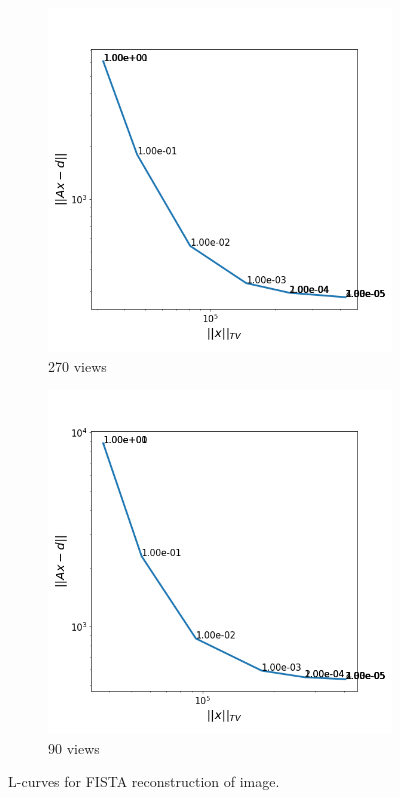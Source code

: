 \documentclass[12pt]{article}
\begin{document}
\begin{figure}[h]
\begin{subfigure}[t]{0.3\textwidth}
		\includegraphics[width=\linewidth]{../results/fista270Lcurve.png}
		\caption{270 views}
		\label{fig:lcurve270}
	\end{subfigure}
	\hfill
	\begin{subfigure}[t]{0.3\textwidth}
		\includegraphics[width=\linewidth]{../results/fistaFullLcurve.png}
		\caption{90 views}
		\label{fig:lcurve90}
	\end{subfigure}
	
	\caption{L-curves for FISTA reconstruction of image.}
	\label{fig:lcurves}
\end{figure}
\end{document}
